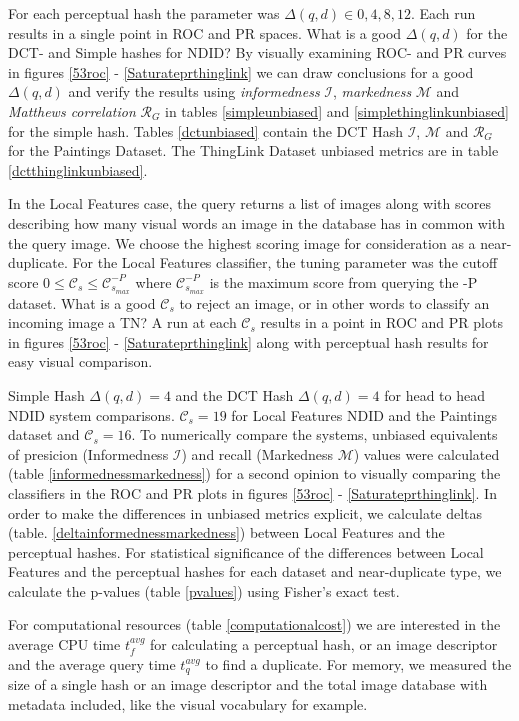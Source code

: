 \documentclass[english,12pt,a4paper,pdftex,elec,utf8, table]{aaltothesis}
\begin{document}
For each perceptual hash the parameter was $\Delta(q,d) \in {0,4,8,12}$. Each run results in a single point in ROC and PR spaces. What is a good $\Delta(q,d)$ for the DCT- and Simple hashes for NDID? By visually examining ROC- and PR curves in figures \ref{53roc} - \ref{Saturateprthinglink} we can draw conclusions for a good $\Delta(q,d)$ and verify the results using \emph{informedness} $\mathcal{I}$, \emph{markedness} $\mathcal{M}$ and \emph{Matthews correlation} $\mathcal{R}_G$ in tables \ref{simpleunbiased} and \ref{simplethinglinkunbiased} for the simple hash. Tables \ref{dctunbiased} contain the DCT Hash $\mathcal{I}$, $\mathcal{M}$ and $\mathcal{R}_G$ for the Paintings Dataset. The ThingLink Dataset unbiased metrics are in table \ref{dctthinglinkunbiased}.

In the Local Features case, the query returns a list of images along with scores describing how many visual words an image in the database has in common with the query image. We choose the highest scoring image for consideration as a near-duplicate.
For the Local Features classifier, the tuning parameter was the cutoff score $0 \leq \mathcal{C}_s \leq \mathcal{C}_{s_{max}}^{-P}$ where $\mathcal{C}_{s_{max}}^{-P}$ is the maximum score from querying the -P dataset. What is a good $\mathcal{C}_s$ to reject an image, or in other words to classify an incoming image a TN?  A run at each $\mathcal{C}_s$ results in a point in ROC and PR plots in figures \ref{53roc} - \ref{Saturateprthinglink} along with perceptual hash results for easy visual comparison.

Simple Hash $\Delta(q,d)=4$ and the DCT Hash $\Delta(q,d)=4$ for head to head NDID system comparisons. $\mathcal{C}_s=19$ for Local Features NDID and the Paintings dataset and $\mathcal{C}_s=16$. To numerically compare the systems, unbiased equivalents of presicion (Informedness $\mathcal{I}$) and recall (Markedness $\mathcal{M}$) values were calculated (table \ref{informednessmarkedness}) for a second opinion to visually comparing the classifiers in the ROC and PR plots in figures \ref{53roc} - \ref{Saturateprthinglink}. In order to make the differences in unbiased metrics explicit, we calculate deltas (table. \ref{deltainformednessmarkedness}) between Local Features and the perceptual hashes. For statistical significance of the differences between Local Features and the perceptual hashes for each dataset and near-duplicate type, we calculate the p-values (table \ref{pvalues}) using Fisher's exact test.

For computational resources (table \ref{computationalcost}) we are interested in the average CPU time $t_f^{avg}$ for calculating a perceptual hash, or an image descriptor and the average query time $t_q^{avg}$ to find a duplicate. For memory, we measured the size of a single hash or an image descriptor and the total image database with metadata included, like the visual vocabulary for example.
\end{document}
